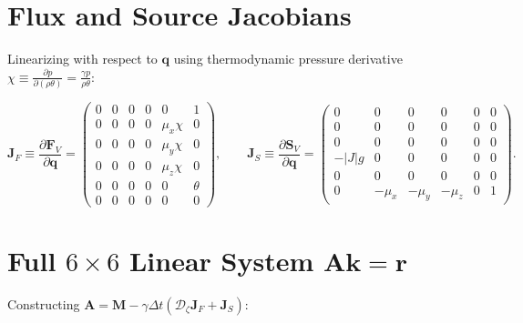 \documentclass[11pt,a4paper]{article}
\begin{document}
		\section{Flux and Source Jacobians}
		
		Linearizing with respect to $\boldsymbol{q}$ using thermodynamic pressure derivative $\chi \equiv \frac{\partial p}{\partial (\rho \theta)} = \frac{\gamma p}{\rho \theta}$:
		
		\begin{equation}
			\mathbf{J}_F \equiv \frac{\partial \mathbf{F}_V}{\partial \boldsymbol{q}} = \begin{pmatrix}
				0 & 0 & 0 & 0 & 0 & 1 \\[6pt]
				0 & 0 & 0 & 0 & \mu_x \chi & 0 \\[6pt]
				0 & 0 & 0 & 0 & \mu_y \chi & 0 \\[6pt]
				0 & 0 & 0 & 0 & \mu_z \chi & 0 \\[6pt]
				0 & 0 & 0 & 0 & 0 & \theta \\[6pt]
				0 & 0 & 0 & 0 & 0 & 0
			\end{pmatrix}, \qquad
			\mathbf{J}_S \equiv \frac{\partial \mathbf{S}_V}{\partial \boldsymbol{q}} = \begin{pmatrix}
				0 & 0 & 0 & 0 & 0 & 0 \\[6pt]
				0 & 0 & 0 & 0 & 0 & 0 \\[6pt]
				0 & 0 & 0 & 0 & 0 & 0 \\[6pt]
				-|J| g & 0 & 0 & 0 & 0 & 0 \\[6pt]
				0 & 0 & 0 & 0 & 0 & 0 \\[6pt]
				0 & -\mu_x & -\mu_y & -\mu_z & 0 & 1
			\end{pmatrix}.
		\end{equation}
		
		\section{Full $6 \times 6$ Linear System $\mathbf{A} \boldsymbol{k} = \boldsymbol{r}$}
		
		Constructing $\mathbf{A} = \mathbf{M} - \gamma \Delta t \left( \mathcal{D}_\zeta \mathbf{J}_F + \mathbf{J}_S \right)$:
		
\end{document}
